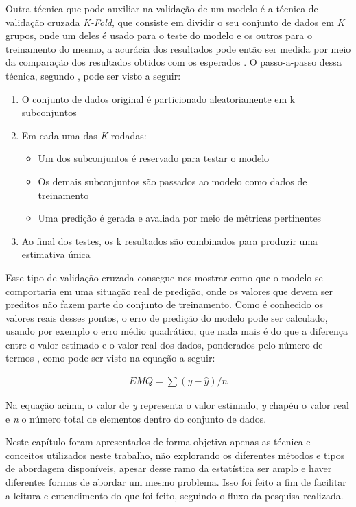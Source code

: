 Outra técnica que pode auxiliar na validação de um modelo é a técnica de
validação cruzada \textit{K-Fold}, que consiste em dividir o seu conjunto de
dados em \textit{K} grupos, onde um deles é usado para o teste do modelo e
os outros para o treinamento do mesmo, a acurácia dos resultados pode então ser
medida por meio da comparação dos resultados obtidos com os esperados
\cite{tassia:2011}. O passo-a-passo dessa técnica, segundo
, pode ser visto a seguir:

\begin{enumerate}
  \item O conjunto de dados original é particionado aleatoriamente em k
    subconjuntos
  \item Em cada uma das \textit{K} rodadas:
    \begin{itemize}
      \item Um dos subconjuntos é reservado para testar o modelo
      \item Os demais subconjuntos são passados ao modelo como dados de treinamento
      \item Uma predição é gerada e avaliada por meio de métricas pertinentes
    \end{itemize}
  \item Ao final dos testes, os k resultados são combinados para produzir uma
    estimativa única
\end{enumerate}

Esse tipo de validação cruzada consegue nos mostrar como que o modelo se
comportaria em uma situação real de predição, onde os valores que devem ser
preditos não fazem parte do conjunto de treinamento. Como é conhecido os valores
reais desses pontos, o erro de predição do modelo pode ser calculado, usando por
exemplo o erro médio quadrático, que nada mais é do que a diferença entre o
valor estimado e o valor real dos dados, ponderados pelo número de termos
\cite{caetano:2012}, como pode ser visto na equação a seguir:

\begin{align*}
  EMQ = \sum (y - \hat{y}) / n
\end{align*}

Na equação acima, o valor de \textit{y} representa o valor estimado,
\textit{y} chapéu o valor real e \textit{n} o número total de elementos dentro do
conjunto de dados.



Neste capítulo foram apresentados de forma objetiva apenas as técnica e
conceitos utilizados neste trabalho, não explorando os diferentes métodos e tipos de
abordagem disponíveis, apesar desse ramo da estatística ser amplo e haver diferentes formas
de abordar um mesmo problema. Isso foi feito a fim de facilitar a leitura e
entendimento do que foi feito, seguindo o fluxo da pesquisa realizada.

